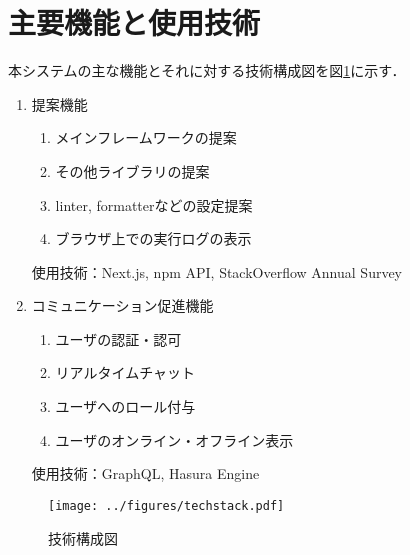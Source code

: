 \documentclass[main]{subfiles}
\begin{document}
\section{主要機能と使用技術}
本システムの主な機能とそれに対する技術構成図を図\ref{fig:techstack}に示す．

\begin{enumerate}
\item 提案機能
\begin{enumerate}
\item メインフレームワークの提案
\item その他ライブラリの提案
\item linter, formatterなどの設定提案
\item ブラウザ上での実行ログの表示
\end{enumerate}
使用技術：Next.js, npm API\cite{npm}, StackOverflow Annual Survey\cite{stackoverflow}

\item コミュニケーション促進機能
\begin{enumerate}
\item ユーザの認証・認可
\item リアルタイムチャット
\item ユーザへのロール付与
\item ユーザのオンライン・オフライン表示
\end{enumerate}
使用技術：GraphQL, Hasura Engine
\end{enumerate}

\begin{figure}[h]
    \centering
    \texttt{[image: ../figures/techstack.pdf]}
    \caption{技術構成図}
    \label{fig:techstack}
\end{figure}
\end{document}

